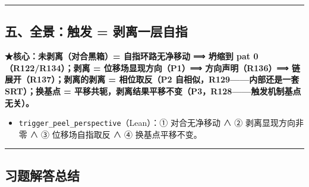 \documentclass[
]{article}
\providecommand{\tightlist}{%
 \setlength{\itemsep}{0pt}\setlength{\parskip}{0pt}}
\begin{document}
\begin{center}\rule{0.5\linewidth}{0.5pt}\end{center}

\subsection{五、全景：触发 =
剥离一层自指}\label{ux4e94ux5168ux666fux89e6ux53d1-ux5265ux79bbux4e00ux5c42ux81eaux6307}

\textbf{★核心：未剥离（对合黑箱）= 自指环路无净移动 ⟹ 坍缩到 pat
0（R122/R134）；剥离 = 位移场显现方向（P1）⟹ 方向声明（R136）⟹
链展开（R137）；剥离的剥离 = 相位取反（P2 自相似，R129------内部还是一套
SRT）；换基点 =
平移共轭，剥离结果平移不变（P3，R128------触发机制基点无关）。}

\begin{itemize}
\tightlist
\item
 \texttt{trigger\_peel\_perspective}（Lean）：① 对合无净移动 ∧ ②
 剥离显现方向非零 ∧ ③ 位移场自指取反 ∧ ④ 换基点平移不变。
\end{itemize}

\begin{center}\rule{0.5\linewidth}{0.5pt}\end{center}

\subsection{习题解答总结}\label{ux4e60ux9898ux89e3ux7b54ux603bux7ed3}
\end{document}

